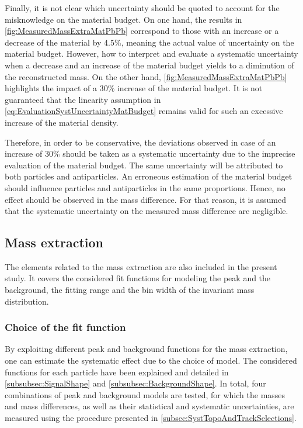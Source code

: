 Finally, it is not clear which uncertainty should be quoted to account for the misknowledge on the material budget. On one hand, the results in \fig\ref{fig:MeasuredMassExtraMatPbPb} correspond to those with an increase or a decrease of the material by 4.5\%, meaning the actual value of uncertainty on the material budget. However, how to interpret and evaluate a systematic uncertainty when a decrease and an increase of the material budget yields to a diminution of the reconstructed mass. On the other hand, \fig\ref{fig:MeasuredMassExtraMatPbPb} highlights the impact of a 30\% increase of the material budget. It is not guaranteed that the linearity assumption in \eq\ref{eq:EvaluationSystUncertaintyMatBudget} remains valid for such an excessive increase of the material density.

Therefore, in order to be conservative, the deviations observed in case of an increase of 30\% should be taken as a systematic uncertainty due to the imprecise evaluation of the material budget. The same uncertainty will be attributed to both particles and antiparticles. An erroneous estimation of the material budget should influence particles and antiparticles in the same proportions. Hence, no effect should be observed in the mass difference. For that reason, it is assumed that the systematic uncertainty on the measured mass difference are negligible. 


\subsection{Mass extraction}

The elements related to the mass extraction are also included in the present study. It covers the considered fit functions for modeling the peak and the background, the fitting range and the bin width of the invariant mass distribution.

\subsubsection{Choice of the fit function}

By exploiting different peak and background functions for the mass extraction, one can estimate the systematic effect due to the choice of model. The considered functions for each particle have been explained and detailed in \Sec\ref{subsubsec:SignalShape} and \ref{subsubsec:BackgroundShape}. In total, four combinations of peak and background models are tested, for which the masses and mass differences, as well as their statistical and systematic uncertainties, are measured using the procedure presented in \Sec\ref{subsec:SystTopoAndTrackSelections}. 

